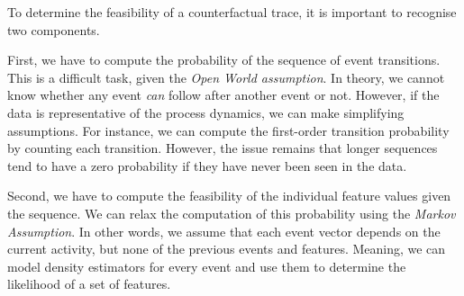 \documentclass[./../../paper.tex]{subfiles}
\begin{document}
To determine the feasibility of a counterfactual trace, it is important to recognise two components. 

First, we have to compute the probability of the sequence of event transitions. This is a difficult task, given the \emph{Open World assumption}. In theory, we cannot know whether any event \emph{can} follow after another event or not. However, if the data is representative of the process dynamics, we can make simplifying assumptions. For instance, we can compute the first-order transition probability by counting each transition. However, the issue remains that longer sequences tend to have a zero probability if they have never been seen in the data. %

Second, we have to compute the feasibility of the individual feature values given the sequence. We can relax the computation of this probability using the \emph{Markov Assumption}. In other words, we assume that each event vector depends on the current activity, but none of the previous events and features. Meaning, we can model density estimators for every event and use them to determine the likelihood of a set of features. 



\end{document}
